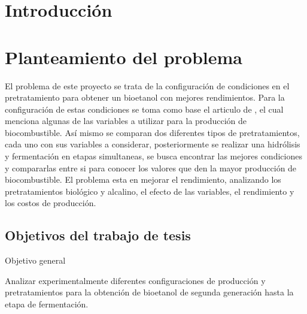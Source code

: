 \documentclass[12pt]{article}
\begin{document}
	
	\pagestyle{empty}
	
	
	\tableofcontents
	\date{}
     \newpage
	\listoftables
	\clearpage
	\newpage
	
	
	\pagestyle{plain}
	\setcounter{page}{1} 
	
		\section{Introducción}
	
	
	\section{Planteamiento del problema}
		
		El problema de este proyecto se trata de la configuración de condiciones en el pretratamiento para obtener un bioetanol con mejores rendimientos. Para la configuración de estas condiciones se toma como base el articulo de \cite{Arturo2022evaluacion}, el cual menciona algunas de las variables a utilizar para la producción de biocombustible. Así mismo se comparan dos diferentes tipos de pretratamientos, cada uno con sus variables a considerar, posteriormente se realizar una hidrólisis y fermentación en etapas simultaneas, se busca encontrar las mejores condiciones y compararlas entre si para conocer los valores que den la mayor producción de biocombustible. El problema esta en mejorar el rendimiento, analizando los pretratamientos biológico y alcalino, el efecto de las variables, el rendimiento y los costos de producción.		
	
		
		
		
		
	\subsection{Objetivos del trabajo de tesis}
	{\large Objetivo general}
	
	Analizar experimentalmente diferentes configuraciones de producción y pretratamientos para la obtención de bioetanol de segunda generación  hasta la etapa de fermentación. \newline \newline
	
\end{document}

